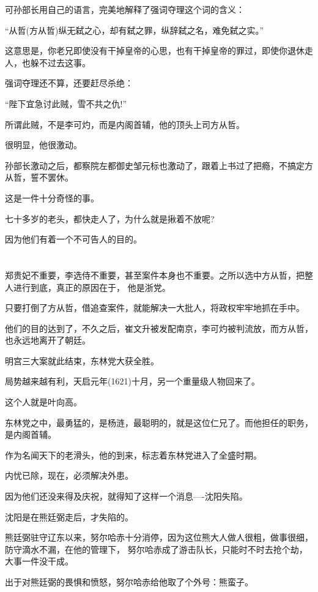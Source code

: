 \documentclass[11pt,a4paper,onecolumn]{article}
\begin{document}
可孙部长用自己的语言，完美地解释了强词夺理这个词的含义：

``从哲(方从哲)纵无弑之心，却有弑之罪，纵辞弑之名，难免弑之实。''

这意思是，你老兄即使没有干掉皇帝的心思，也有干掉皇帝的罪过，即使你退休走人，也躲不过去这事。

强词夺理还不算，还要赶尽杀绝：

``陛下宜急讨此贼，雪不共之仇!''

所谓此贼，不是李可灼，而是内阁首辅，他的顶头上司方从哲。

很明显，他很激动。

孙部长激动之后，都察院左都御史邹元标也激动了，跟着上书过了把瘾，不搞定方从哲，誓不罢休。

这是一件十分奇怪的事。

七十多岁的老头，都快走人了，为什么就是揪着不放呢?

因为他们有着一个不可告人的目的。

\section[\thesection]{}

郑贵妃不重要，李选侍不重要，甚至案件本身也不重要。之所以选中方从哲，把整人进行到底，真正的原因在于，
他是浙党。

只要打倒了方从哲，借追查案件，就能解决一大批人，将政权牢牢地抓在手中。

他们的目的达到了，不久之后，崔文升被发配南京，李可灼被判流放，而方从哲，也永远地离开了朝廷。

明宫三大案就此结束，东林党大获全胜。

局势越来越有利，天启元年(1621)十月，另一个重量级人物回来了。

这个人就是叶向高。

东林党之中，最勇猛的，是杨涟，最聪明的，就是这位仁兄了。而他担任的职务，是内阁首辅。

作为名闻天下的老滑头，他的到来，标志着东林党进入了全盛时期。

内忧已除，现在，必须解决外患。

因为他们还没来得及庆祝，就得知了这样一个消息----沈阳失陷。

沈阳是在熊廷弼走后，才失陷的。

熊廷弼驻守辽东以来，努尔哈赤十分消停，因为这位熊大人做人很粗，做事很细，防守滴水不漏，在他的管理下，
努尔哈赤成了游击队长，只能时不时去抢个劫，大事一件没干成。

出于对熊廷弼的畏惧和愤怒，努尔哈赤给他取了个外号：熊蛮子。
\end{document}
